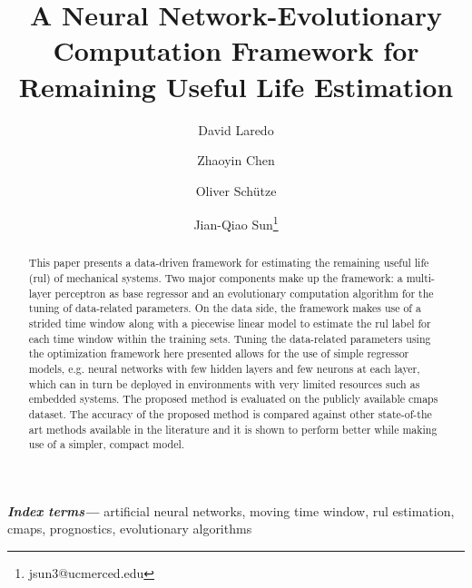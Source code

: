 \documentclass{article}
\title{A Neural Network-Evolutionary Computation Framework for Remaining Useful Life Estimation}
\author[1]{David Laredo}
\author[1]{Zhaoyin Chen}
\author[2]{Oliver Sch\"utze}
\author[1]{Jian-Qiao Sun\thanks{jsun3@ucmerced.edu}}
\affil[1]{School of Mechanical Engineering, University of California, Merced}
\affil[2]{Department of Computer Science, CINVESTAV, Mexico City, Mexico}
\date{}
\providecommand{\keywords}[1]{\textbf{\textit{Index terms---}} #1}
\begin{document}
\maketitle %

\thispagestyle{fancy} %


\glsunsetall


\begin{abstract}

\noindent 

This paper presents a data-driven framework for estimating the remaining useful life (\gls{rul}) of mechanical systems. Two major components make up the framework: a multi-layer perceptron as base regressor and an evolutionary computation algorithm for the tuning of data-related parameters. On the data side, the framework makes use of a strided time window along with a piecewise linear model to estimate the \gls{rul} label for each time window within the training sets. Tuning the data-related parameters using the optimization framework here presented allows for the use of simple regressor models, e.g. neural networks with few hidden layers and few neurons at each layer, which can in turn be deployed in environments with very limited resources such as embedded systems. The proposed method is evaluated on the publicly available \gls{cmaps} dataset. The accuracy of the proposed method is compared against other state-of-the art methods available in the literature and it is shown to perform better while making use of a simpler, compact model.
\end{abstract}

\keywords{artificial neural networks, moving time window, \gls{rul} estimation, \gls{cmaps}, prognostics, evolutionary algorithms}




%
%



\pagebreak
\appendix
{}
\end{document}
